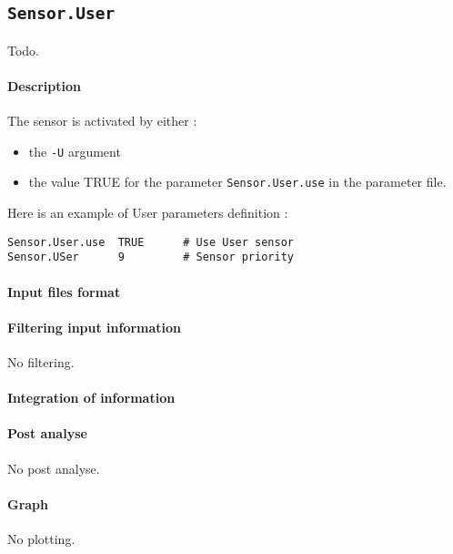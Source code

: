 
\subsection{\texttt{Sensor.User}}
\label{pluguser}

Todo.

\paragraph{Description}

The sensor is activated by either :
\begin{itemize}
\item the \texttt{-U} argument 
\item the value TRUE for the parameter \texttt{Sensor.User.use} in the
  parameter file.
\end{itemize}
Here is an example of User parameters definition :
\begin{Verbatim}[fontsize=\small]
Sensor.User.use  TRUE      # Use User sensor
Sensor.USer      9         # Sensor priority
\end{Verbatim}

\paragraph{Input files format}

\paragraph{Filtering input information}

No filtering.

\paragraph{Integration of information}

\paragraph{Post analyse}

No post analyse.

\paragraph{Graph}

No plotting.




